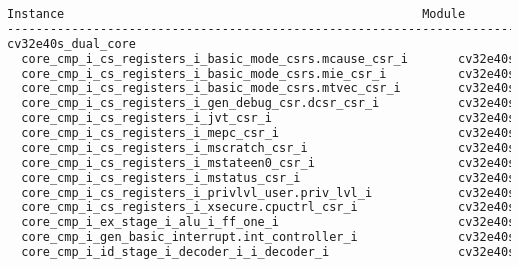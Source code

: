 \begin{lstlisting}[caption={Area report from synthesis of the CV32E40DC.}, label=lst:cv32e40dc_area, language=txt]
                           Instance                                                  Module                        Cell Count  Cell Area  Net Area   Total Area 
----------------------------------------------------------------------------------------------------------------------------------------------------------------
cv32e40s_dual_core                                                                                                      29351  97142.022 43445.210   140587.232 
  core_cmp_i_cs_registers_i_basic_mode_csrs.mcause_csr_i       cv32e40s_csr_LIB0_WIDTH32_SHADOWCOPY1_RESETVALUE0_          29     43.776    39.057       82.833 
  core_cmp_i_cs_registers_i_basic_mode_csrs.mie_csr_i          cv32e40s_csr_LIB0_WIDTH32_SHADOWCOPY1_RESETVALUE0_          44     69.084    60.059      129.143 
  core_cmp_i_cs_registers_i_basic_mode_csrs.mtvec_csr_i        cv32e40s_csr_LIB0_WIDTH32_SHADOWCOPY1_RESETVALUE1_          62     96.102    84.367      180.469 
  core_cmp_i_cs_registers_i_gen_debug_csr.dcsr_csr_i           cv32e40s_csr_LIB0_WIDTH32_SHADOWCOPY1_RESETVALUE10          24     35.568    33.868       69.436 
  core_cmp_i_cs_registers_i_jvt_csr_i                          cv32e40s_csr_LIB0_WIDTH32_SHADOWCOPY1_RESETVALUE0_          62     96.102    84.367      180.469 
  core_cmp_i_cs_registers_i_mepc_csr_i                         cv32e40s_csr_LIB0_WIDTH32_SHADOWCOPY1_RESETVALUE0_          72    113.886    98.736      212.622 
  core_cmp_i_cs_registers_i_mscratch_csr_i                     cv32e40s_csr_LIB0_WIDTH32_SHADOWCOPY1_RESETVALUE0_          75    116.964   102.062      219.026 
  core_cmp_i_cs_registers_i_mstateen0_csr_i                    cv32e40s_csr_LIB0_WIDTH32_SHADOWCOPY1_RESETVALUE0_           2      3.078     2.585        5.663 
  core_cmp_i_cs_registers_i_mstatus_csr_i                      cv32e40s_csr_LIB0_WIDTH32_SHADOWCOPY1_RESETVALUE61          14     22.572    19.519       42.091 
  core_cmp_i_cs_registers_i_privlvl_user.priv_lvl_i            cv32e40s_csr_LIB0_WIDTH2_SHADOWCOPY1_RESETVALUE3_M           5      7.524     6.272       13.796 
  core_cmp_i_cs_registers_i_xsecure.cpuctrl_csr_i              cv32e40s_csr_LIB0_WIDTH32_SHADOWCOPY1_RESETVALUE25          21     32.832    28.376       61.208 
  core_cmp_i_ex_stage_i_alu_i_ff_one_i                         cv32e40s_ff_one                                             52     85.158    50.347      135.505 
  core_cmp_i_gen_basic_interrupt.int_controller_i              cv32e40s_int_controller                                     79    211.698    53.007      264.705 
  core_cmp_i_id_stage_i_decoder_i_i_decoder_i                  cv32e40s_i_decoder_CLIC0                                   168    251.370   159.896      411.266 

\end{lstlisting}
